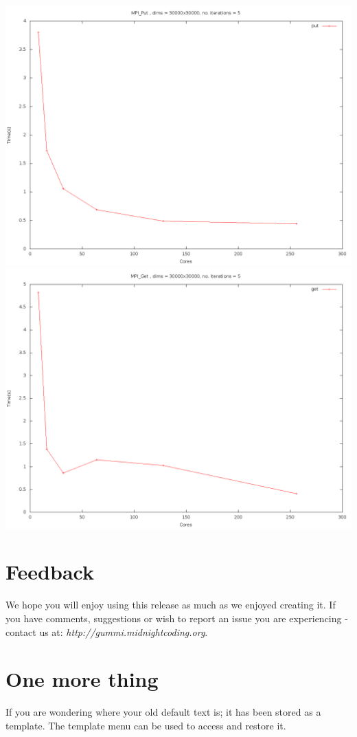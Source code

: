 \documentclass[11pt]{article}
\begin{document}
\includegraphics[width=\textwidth]{putcxt.png}
\includegraphics[width=\textwidth]{getcxt.png}

\section{Feedback}
We hope you will enjoy using this release as much as we enjoyed creating it. If you have comments, suggestions or wish to report an issue you are experiencing - contact us at: \emph{http://gummi.midnightcoding.org}.

\section{One more thing}
If you are wondering where your old default text is; it has been stored as a template. The template menu can be used to access and restore it. 
\end{document}
